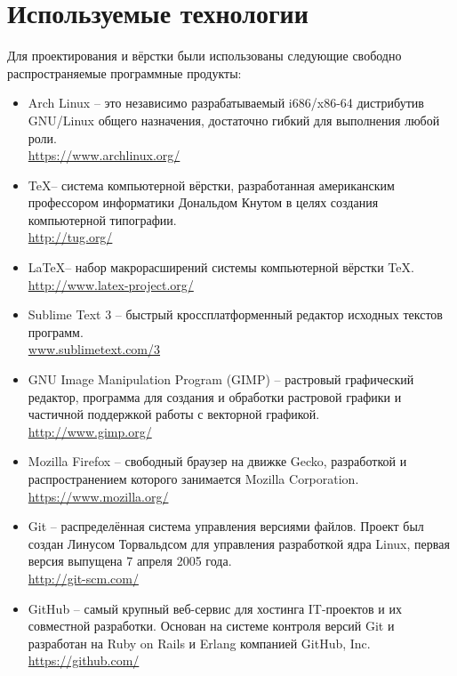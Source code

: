 \documentclass[a4paper, 14pt]{extreport}
\begin{document}
    \chapter{Используемые технологии}
    Для проектирования и вёрстки были использованы следующие свободно распространяемые программные 
    продукты:
    \begin{itemize}
        \item Arch Linux -- это независимо разрабатываемый i686/x86-64 дистрибутив GNU/Linux общего 
            назначения, достаточно гибкий для выполнения любой роли.\\
            \url{https://www.archlinux.org/}
        \item \TeX -- система компьютерной вёрстки, разработанная американским профессором информатики 
            Дональдом Кнутом в целях создания компьютерной типографии.\\
            \url{http://tug.org/}
        \item \LaTeX -- набор макрорасширений системы компьютерной вёрстки TeX.\\
            \url{http://www.latex-project.org/}
        \item Sublime Text 3 -- быстрый кроссплатформенный редактор исходных текстов программ.\\
            \url{www.sublimetext.com/3}
        \item GNU Image Manipulation Program (GIMP) -- растровый графический редактор, программа для 
            создания и обработки растровой графики и частичной поддержкой работы с векторной графикой.\\
            \url{http://www.gimp.org/}
        \item Mozilla Firefox -- свободный браузер на движке Gecko, разработкой и распространением 
            которого занимается Mozilla Corporation.\\
            \url{https://www.mozilla.org/}
        \item Git -- распределённая система управления версиями файлов. Проект был создан Линусом 
            Торвальдсом для управления разработкой ядра Linux, первая версия выпущена 7 апреля 2005 года.\\
            \url{http://git-scm.com/}
        \item GitHub -- самый крупный веб-сервис для хостинга IT-проектов и их совместной разработки. 
            Основан на системе контроля версий Git и разработан на Ruby on Rails и Erlang компанией 
            GitHub, Inc.\\
            \url{https://github.com/}
    \end{itemize}
\end{document}
